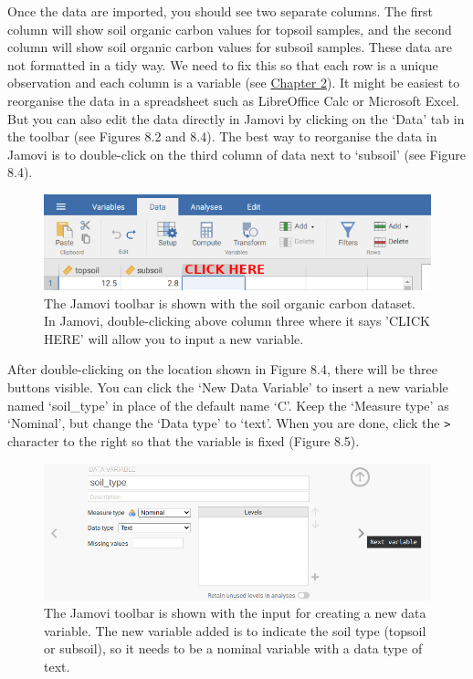 \documentclass[
]{scrbook}
\begin{document}
Once the data are imported, you should see two separate columns.
The first column will show soil organic carbon values for topsoil samples, and the second column will show soil organic carbon values for subsoil samples.
These data are not formatted in a tidy way.
We need to fix this so that each row is a unique observation and each column is a variable (see \protect\hyperlink{Chapter_2}{Chapter 2}).
It might be easiest to reorganise the data in a spreadsheet such as LibreOffice Calc or Microsoft Excel.
But you can also edit the data directly in Jamovi by clicking on the `Data' tab in the toolbar (see Figures 8.2 and 8.4).
The best way to reorganise the data in Jamovi is to double-click on the third column of data next to `subsoil' (see Figure 8.4).

\begin{figure}
\includegraphics[width=1\linewidth]{img/jamovi_new_variable} \caption{The Jamovi toolbar is shown with the soil organic carbon dataset. In Jamovi, double-clicking above column three where it says 'CLICK HERE' will allow you to input a new variable.}\label{fig:unnamed-chunk-27}
\end{figure}

After double-clicking on the location shown in Figure 8.4, there will be three buttons visible.
You can click the `New Data Variable' to insert a new variable named `soil\_type' in place of the default name `C'.
Keep the `Measure type' as `Nominal', but change the `Data type' to `text'.
When you are done, click the \texttt{\textgreater{}} character to the right so that the variable is fixed (Figure 8.5).

\begin{figure}
\includegraphics[width=1\linewidth]{img/jamovi_set_variable} \caption{The Jamovi toolbar is shown with the input for creating a new data variable. The new variable added is to indicate the soil type (topsoil or subsoil), so it needs to be a nominal variable with a data type of text.}\label{fig:unnamed-chunk-28}
\end{figure}
\end{document}
